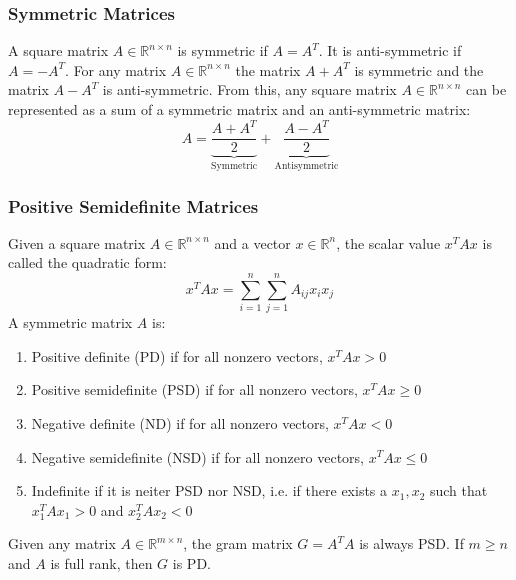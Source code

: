 \documentclass[twoside,twocolumn]{article}
\begin{document}
\subsubsection{Symmetric Matrices}
A square matrix $A \in \mathbb{R}^{n \times n}$ is symmetric if $A=A^T$. It
is anti-symmetric if $A=-A^T$. For any matrix $A\in \mathbb{R}^{n \times n}$
the matrix $A+A^T$ is symmetric and the matrix $A-A^T$ is anti-symmetric.
From this, any square matrix $A \in \mathbb{R}^{n \times n}$ can be represented
as a sum of a symmetric matrix and an anti-symmetric matrix:
\begin{equation}
  A=\underbrace{\frac{A+A^T}{2}}_{\textrm{Symmetric}}+\underbrace{\frac{A-A^T}{2}}_{\textrm{Antisymmetric}}
\end{equation}
\subsubsection{Positive Semidefinite Matrices}
Given a square matrix $A \in \mathbb{R}^{n \times n}$ and a vector
$x \in \mathbb{R}^n$, the scalar value $x^TAx$ is called the quadratic form:
\begin{equation}
  x^TAx = \sum_{i=1}^n \sum_{j=1}^n A_{ij} x_i x_j
\end{equation}
A symmetric matrix $A$ is:
\begin{enumerate}
  \item Positive definite (PD) if for all nonzero vectors, $x^TAx > 0$
  \item Positive semidefinite (PSD) if for all nonzero vectors, $x^TAx \geq 0$
  \item Negative definite (ND) if for all nonzero vectors, $x^TAx < 0$
  \item Negative semidefinite (NSD) if for all nonzero vectors, $x^TAx \leq 0$
  \item Indefinite if it is neiter PSD nor NSD, i.e. if there exists a $x_1, x_2$
    such that $x^T_1Ax_1 > 0$ and $x^T_2Ax_2 < 0$
\end{enumerate}
Given any matrix $A \in \mathbb{R}^{m \times n}$, the gram matrix $G = A^T A$
is always PSD. If $m \geq n$ and $A$ is full rank, then $G$ is PD.
\end{document}
